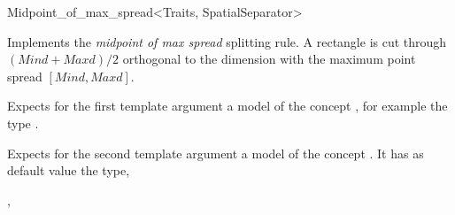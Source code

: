 

\begin{ccRefFunctionObjectClass}{Midpoint_of_max_spread<Traits, SpatialSeparator>}


\ccDefinition
Implements the {\em midpoint of max spread} splitting rule.
A rectangle is cut through $(Mind+Maxd)/2$ orthogonal
to the dimension with the maximum point spread $[Mind,Maxd]$.


\ccParameters

Expects for the first template argument a model of
the concept , for example
the type . 

Expects for the second template argument a model of the concept . It has as default value
the type, 


\ccIsModel



\ccCreation
{}  %


\ccSeeAlso

,\\

\end{ccRefFunctionObjectClass}


